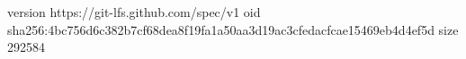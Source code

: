 version https://git-lfs.github.com/spec/v1
oid sha256:4bc756d6c382b7cf68dea8f19fa1a50aa3d19ac3cfedacfcae15469eb4d4ef5d
size 292584
